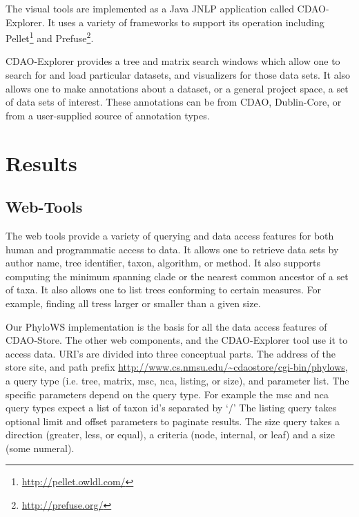 \documentclass[10pt]{bmc_article}
\newenvironment{bmcformat}{\begin{raggedright}\baselineskip20pt\sloppy\setboolean{publ}{false}}{\end{raggedright}\baselineskip20pt\sloppy}
\begin{document}
\begin{bmcformat}
The visual tools are implemented as a Java JNLP application called CDAO-Explorer. It uses a variety of frameworks
to support its operation including Pellet\footnote{\url{http://pellet.owldl.com/}} and
  Prefuse\footnote{\url{http://prefuse.org/}}. 

CDAO-Explorer provides a tree and matrix search windows which allow one to search for and load particular datasets,
and visualizers for those data sets. It also allows one to make annotations about a dataset, or a general project space,
a set of data sets of interest. These annotations can be from CDAO, Dublin-Core, or from a user-supplied source of
annotation types.



 
\section*{Results}
  \subsection*{Web-Tools}
  The web tools provide a variety of querying and data access features for both
human and programmatic access to data. It allows one to retrieve data sets by
author name, tree identifier, taxon, algorithm, or method. It also supports
computing the minimum spanning clade or the nearest common ancestor of a set of
taxa. It also allows one to  list trees conforming to certain measures. For
example, finding all tress larger or smaller than a given size. 

   Our PhyloWS implementation is the basis for all the data access features of
CDAO-Store. The other web components, and the CDAO-Explorer tool use it to
access data. URI's are divided into three conceptual parts. The address of the
store site, and path prefix
\url{http://www.cs.nmsu.edu/~cdaostore/cgi-bin/phylows}, a query type (i.e.
tree, matrix, msc, nca, listing, or size), and parameter list. The specific
parameters depend on the query type. For example the msc and nca query types
expect a list of taxon id's separated by `/' The listing query takes optional
limit and offset parameters to paginate results. The size query takes a
direction (greater, less, or equal),  a criteria (node, internal, or leaf) and
a size (some numeral).


\end{bmcformat}
\end{document}
